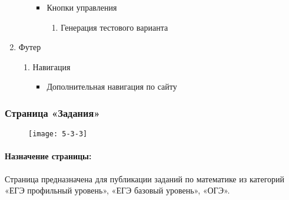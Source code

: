 \begin{enumerate}
\begin{enumerate}
\begin{itemize}
		\item Кнопки управления
		\begin{enumerate}
			\item Генерация тестового варианта
		\end{enumerate}
		\end{itemize}
	\end{enumerate}

	\item Футер
	\begin{enumerate}
		\item Навигация
		\begin{itemize}
			\item Дополнительная навигация по сайту
		\end{itemize}
	\end{enumerate}
\end{enumerate}


\subsubsection{Страница «Задания»}
\begin{figure}[H]
	\texttt{[image: 5-3-3]}
\end{figure}
\paragraph{Назначение страницы:} Страница предназначена для публикации заданий по математике из категорий «ЕГЭ профильный уровень», «ЕГЭ базовый уровень», «ОГЭ».

